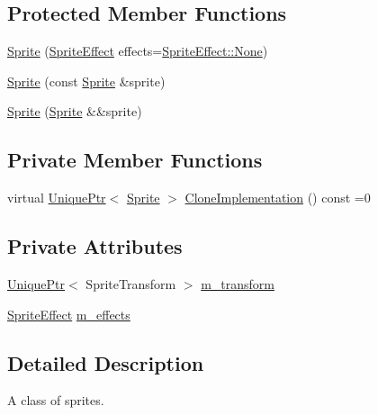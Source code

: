 \subsection*{Protected Member Functions}
\begin{DoxyCompactItemize}
\item 
\hyperlink{classmage_1_1_sprite_a4e7926b7fd1455afcb95e45f25b83246}{Sprite} (\hyperlink{namespacemage_a9cfe18123066ba4236f548f9de75d881}{Sprite\+Effect} effects=\hyperlink{namespacemage_a5e7e18b0154373ce8fc942fe3f6b27fda6adf97f83acf6453d4a6a4b1070f3754}{Sprite\+Effect\+::\+None})
\item 
\hyperlink{classmage_1_1_sprite_a9c1eb4f5a85e1fa17479012dd22114a9}{Sprite} (const \hyperlink{classmage_1_1_sprite}{Sprite} \&sprite)
\item 
\hyperlink{classmage_1_1_sprite_a84d01e440d0a8105d45a3e18a0698d07}{Sprite} (\hyperlink{classmage_1_1_sprite}{Sprite} \&\&sprite)
\end{DoxyCompactItemize}
\subsection*{Private Member Functions}
\begin{DoxyCompactItemize}
\item 
virtual \hyperlink{namespacemage_a3316d7143a973e37adf1110f2e80ca31}{Unique\+Ptr}$<$ \hyperlink{classmage_1_1_sprite}{Sprite} $>$ \hyperlink{classmage_1_1_sprite_a214890d7da493bccadb2327b8c7ffb09}{Clone\+Implementation} () const =0
\end{DoxyCompactItemize}
\subsection*{Private Attributes}
\begin{DoxyCompactItemize}
\item 
\hyperlink{namespacemage_a3316d7143a973e37adf1110f2e80ca31}{Unique\+Ptr}$<$ Sprite\+Transform $>$ \hyperlink{classmage_1_1_sprite_ae9907dd9d43fe2ce025bbc86b06dc7a3}{m\+\_\+transform}
\item 
\hyperlink{namespacemage_a9cfe18123066ba4236f548f9de75d881}{Sprite\+Effect} \hyperlink{classmage_1_1_sprite_a87a51b2b131c28bad75768d14defa3c1}{m\+\_\+effects}
\end{DoxyCompactItemize}


\subsection{Detailed Description}
A class of sprites. 

